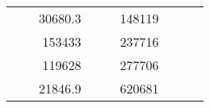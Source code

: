 \begin{table}[]
\begin{tabular}{|ccrccrccc}
\multicolumn{1}{|c|}{\cellcolor[HTML]{FFFFC7}}                                & \multicolumn{1}{c|}{\cellcolor[HTML]{DDFDFF}}                      & \multicolumn{1}{r|}{\cellcolor[HTML]{DAE8FC}30680.3}   & \multicolumn{1}{c|}{\cellcolor[HTML]{FFFFC7}}                                & \multicolumn{1}{c|}{\cellcolor[HTML]{DDFDFF}}                       & \multicolumn{1}{r|}{\cellcolor[HTML]{DDFDFF}148119}    &                                                                              &                                                                    &                                                        \\ \cline{3-3} \cline{6-6}
\multicolumn{1}{|c|}{\cellcolor[HTML]{FFFFC7}}                                & \multicolumn{1}{c|}{\cellcolor[HTML]{DDFDFF}}                      & \multicolumn{1}{r|}{\cellcolor[HTML]{DDFDFF}153433}    & \multicolumn{1}{c|}{\cellcolor[HTML]{FFFFC7}}                                & \multicolumn{1}{c|}{\cellcolor[HTML]{DDFDFF}}                       & \multicolumn{1}{r|}{\cellcolor[HTML]{DAE8FC}237716}    &                                                                              &                                                                    &                                                        \\ \cline{3-3} \cline{6-6}
\multicolumn{1}{|c|}{\cellcolor[HTML]{FFFFC7}}                                & \multicolumn{1}{c|}{\cellcolor[HTML]{DDFDFF}}                      & \multicolumn{1}{r|}{\cellcolor[HTML]{DAE8FC}119628}    & \multicolumn{1}{c|}{\cellcolor[HTML]{FFFFC7}}                                & \multicolumn{1}{c|}{\cellcolor[HTML]{DDFDFF}}                       & \multicolumn{1}{r|}{\cellcolor[HTML]{DDFDFF}277706}    &                                                                              &                                                                    &                                                        \\ \cline{3-3} \cline{6-6}
\multicolumn{1}{|c|}{\cellcolor[HTML]{FFFFC7}}                                & \multicolumn{1}{c|}{\cellcolor[HTML]{DDFDFF}}                      & \multicolumn{1}{r|}{\cellcolor[HTML]{DDFDFF}21846.9}   & \multicolumn{1}{c|}{\cellcolor[HTML]{FFFFC7}}                                & \multicolumn{1}{c|}{\cellcolor[HTML]{DDFDFF}}                       & \multicolumn{1}{r|}{\cellcolor[HTML]{DAE8FC}620681}    &                                                                              &                                                                    &                                                        \\ \cline{3-3} \cline{6-6}

\end{tabular}
\end{table}
